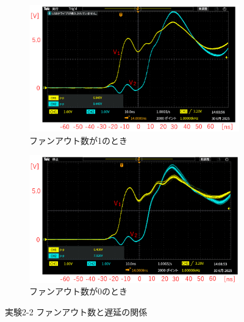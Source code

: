 \documentclass[uplatex, a4j, dvipdfmx]{jsarticle}
\begin{document}
\begin{figure}[htbp]
    \begin{subfigure}[b]{0.48\textwidth}
        \centering
        \includegraphics[width=\linewidth]{picture/O13.png}
        \caption{ファンアウト数が1のとき}
        \label{O13}
    \end{subfigure}
    \hfill
    \begin{subfigure}[b]{0.48\textwidth}
        \centering
        \includegraphics[width=\linewidth]{picture/O14.png}
        \caption{ファンアウト数が0のとき}
        \label{O14}
    \end{subfigure}
    \caption{実験2-2 ファンアウト数と遅延の関係}
    \label{O11-14}
\end{figure}

\clearpage
\end{document}
